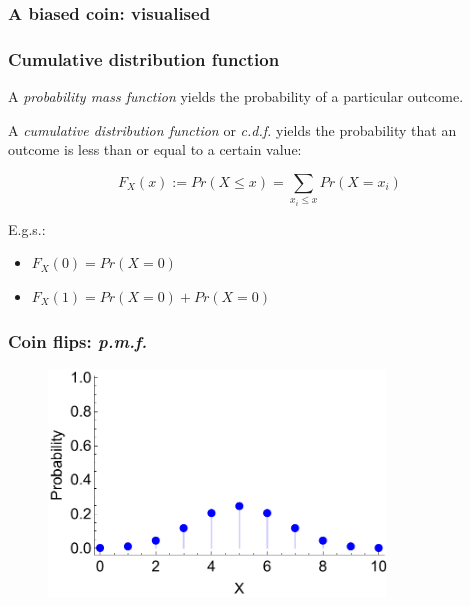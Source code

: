 \documentclass{beamer}
\begin{document}
	\begin{frame}
		\frametitle{A biased coin: visualised}
		
		\begin{figure}[t]
			\centerline{}
		\end{figure}
			
	\end{frame}
	
	\begin{frame}
		\frametitle{Cumulative distribution function}
		
		A \textit{probability mass function} yields the probability of a particular outcome.
		
		\vspace{0.5cm}
		
		A \textit{cumulative distribution function} or \textit{c.d.f.} yields the probability that an outcome is less than or equal to a certain value:
		
		\begin{equation}
		F_X(x) := Pr(X\leq x) = \sum_{x_i \leq x} Pr(X = x_i)
		\end{equation}
		
		E.g.s.:
		
		\begin{itemize}
			\item $F_X(0) = Pr(X=0)$
			\item $F_X(1) = Pr(X=0) + Pr(X=0)$
		\end{itemize}
		
	\end{frame}
	
	\begin{frame}
		\frametitle{Coin flips: \textit{p.m.f.}}
		
		\begin{figure}[ht]
			\includegraphics[width=0.8\textwidth]{./figures/binomial_cdf_1.pdf}
		\end{figure}
		
	\end{frame}
	
\end{document}
